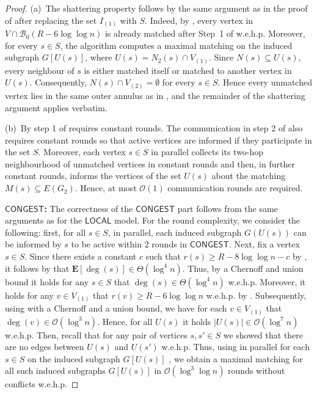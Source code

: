 \documentclass[letterpaper,11pt]{article}
\newcommand{\E}[1]{\mathbf{E}\left[#1\right]}
\newcommand{\wehp}{w.e.h.p.\xspace}
\newcommand{\B}{\mathcal B}
\newcommand{\1}{\mathbb I}
\newcommand{\bigO}{\mathcal{O}}
\newcommand{\CONGEST}{\ensuremath{\mathsf{CONGEST}}\xspace}
\newcommand{\LOCAL}{\ensuremath{\mathsf{LOCAL}}\xspace}
\begin{document}
\begin{proof}
(a)~The shattering property follows by the same argument as in the proof of
 after replacing the set $I_{(1)}$ with $S$.
Indeed, by , every vertex in
$V \cap \B_0(R-6\log\log n)$ is already matched after Step~1 of \algos \wehp
Moreover, for every $s \in S$, the algorithm computes a maximal matching on
the induced subgraph $G[U(s)]$, where $U(s)=N_2(s)\cap V_{(1)}$.
Since $N(s)\subseteq U(s)$, every neighbour of $s$ is either matched itself
or matched to another vertex in $U(s)$. Consequently,
$N(s)\cap V_{(2)}=\emptyset$ for every $s\in S$.
Hence every unmatched vertex lies in the same outer annulus as in
, and the remainder of the shattering argument
applies verbatim.

(b)~By  step 1 of \algos requires constant rounds. The communication in step 2 of \algos also requires constant rounds so that active vertices are informed if they participate in the set $S$. Moreover, each vertex $s \in S$ in parallel collects its two-hop neighbourhood of unmatched vertices in constant rounds and then, in further constant rounds, informs the vertices of the set $U(s)$ about the matching $M(s) \subseteq E(G_2)$. Hence, at most $\bigO(1)$ communication rounds are required.

\smallskip

\textbf{\CONGEST:} The correctness of the \CONGEST part follows from the same arguments as for the \LOCAL model. For the round complexity, we consider the following: first, for all $s \in S$, in parallel, each induced subgraph $G(U(s))$ can be informed by $s$ to be active within $2$ rounds in \CONGEST. Next, fix a vertex $s \in S$. Since there exists a constant $c$ such that $r(s) \geq R - 8\log\log n -c$ by , it follows by  that $\E{\deg(s)} \in \Theta(\log^4 n)$. Thus, by a Chernoff and union bound it holds for any $s \in S$ that $\deg(s) \in \Theta(\log^4 n)$ \wehp Moreover, it holds for any $v \in V_{(1)}$ that $r(v) \geq R - 6\log\log n$ \wehp by . Subsequently, using  with a Chernoff and a union bound, we have for each $v \in V_{(1)}$ that $\deg(v) \in \bigO(\log^3 n)$. Hence, for all $U(s)$ it holds $|U(s)|\in \bigO(\log^7 n)$ \wehp Then, recall that for any pair of vertices $s, s' \in S$ we showed that there are no edges between $U(s)$ and $U(s')$ \wehp Thus, using in parallel for each $s \in S$ on the induced subgraph $G[U(s)]$ \cite[Theorem 1.2]{fischer2020improved}, we obtain a maximal matching for all such induced subgraphs $G[U(s)]$ in $\bigO(\log^3\log n)$ rounds without conflicts \wehp
\end{proof}
\end{document}
